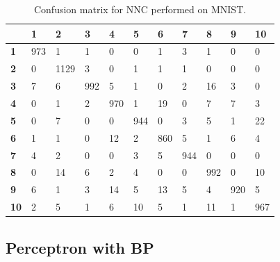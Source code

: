\documentclass[journal]{IEEEtran}
\begin{document}
\begin{table}[H]
	\centering
	\begin{tabular}{|l|l|l|l|l|l|l|l|l|l|l|} \hline
		{\ul }      & \textbf{1} & \textbf{2} & \textbf{3} & \textbf{4} & \textbf{5} & \textbf{6} & \textbf{7} & \textbf{8} & \textbf{9} & \textbf{10} \\ \hline
		\textbf{1}  & 973        & 1          & 1          & 0          & 0          & 1          & 3          & 1          & 0          & 0           \\
		\textbf{2}  & 0          & 1129       & 3          & 0          & 1          & 1          & 1          & 0          & 0          & 0           \\
		\textbf{3}  & 7          & 6          & 992        & 5          & 1          & 0          & 2          & 16         & 3          & 0           \\
		\textbf{4}  & 0          & 1          & 2          & 970        & 1          & 19         & 0          & 7          & 7          & 3           \\
		\textbf{5}  & 0          & 7          & 0          & 0          & 944        & 0          & 3          & 5          & 1          & 22          \\
		\textbf{6}  & 1          & 1          & 0          & 12         & 2          & 860        & 5          & 1          & 6          & 4           \\
		\textbf{7}  & 4          & 2          & 0          & 0          & 3          & 5          & 944        & 0          & 0          & 0           \\
		\textbf{8}  & 0          & 14         & 6          & 2          & 4          & 0          & 0          & 992        & 0          & 10          \\
		\textbf{9}  & 6          & 1          & 3          & 14         & 5          & 13         & 5          & 4          & 920        & 5           \\
		\textbf{10} & 2          & 5          & 1          & 6          & 10         & 5          & 1          & 11         & 1          & 967 \\ \hline   
	\end{tabular}
	\caption{Confusion matrix for NNC performed on MNIST.}
	\label{table:nnconfusion}
\end{table}

\subsection{Perceptron with BP}
\end{document}

